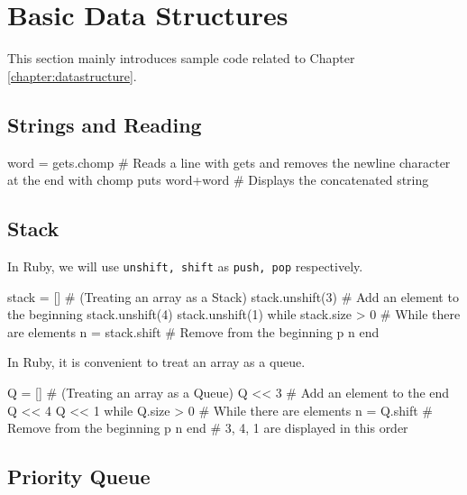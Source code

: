 \section{Basic Data Structures}
This section mainly introduces sample code related to Chapter \ref{chapter:datastructure}.

\subsection{Strings and Reading}
\begin{rbox}
word = gets.chomp # Reads a line with gets and removes the newline character at the end with chomp
puts word+word # Displays the concatenated string
\end{rbox}

\subsection{Stack}

In Ruby, we will use \texttt{unshift, shift} as \texttt{push, pop} respectively.
\begin{rbox}[emph={unshift,shift}]
stack = [] # (Treating an array as a Stack)
stack.unshift(3) # Add an element to the beginning
stack.unshift(4)
stack.unshift(1)
while stack.size > 0 # While there are elements
  n = stack.shift # Remove from the beginning
  p n
end  
\end{rbox}


In Ruby, it is convenient to treat an array as a queue.
\begin{rbox}[emph={shift}]
Q = [] # (Treating an array as a Queue)
Q << 3 # Add an element to the end
Q << 4
Q << 1
while Q.size > 0 # While there are elements
  n = Q.shift # Remove from the beginning
  p n
end
# 3, 4, 1 are displayed in this order
\end{rbox}

\subsection{Priority Queue}


